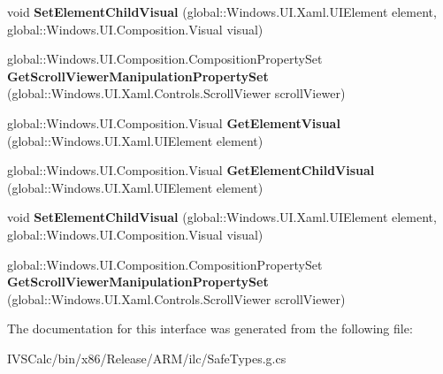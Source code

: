 \begin{DoxyCompactItemize}
void {\bfseries Set\+Element\+Child\+Visual} (global\+::\+Windows.\+U\+I.\+Xaml.\+U\+I\+Element element, global\+::\+Windows.\+U\+I.\+Composition.\+Visual visual)
\item 
\mbox{\label{interface_windows_1_1_u_i_1_1_xaml_1_1_hosting_1_1_i_element_composition_preview_statics_ab27d5dea22cc21e23a4eb65c45a18223}} 
global\+::\+Windows.\+U\+I.\+Composition.\+Composition\+Property\+Set {\bfseries Get\+Scroll\+Viewer\+Manipulation\+Property\+Set} (global\+::\+Windows.\+U\+I.\+Xaml.\+Controls.\+Scroll\+Viewer scroll\+Viewer)
\item 
\mbox{\label{interface_windows_1_1_u_i_1_1_xaml_1_1_hosting_1_1_i_element_composition_preview_statics_ae2b37785a6d7aebf56292ef6ef4b23c8}} 
global\+::\+Windows.\+U\+I.\+Composition.\+Visual {\bfseries Get\+Element\+Visual} (global\+::\+Windows.\+U\+I.\+Xaml.\+U\+I\+Element element)
\item 
\mbox{\label{interface_windows_1_1_u_i_1_1_xaml_1_1_hosting_1_1_i_element_composition_preview_statics_a5c60a91c9c5c8f2c885579f65b715542}} 
global\+::\+Windows.\+U\+I.\+Composition.\+Visual {\bfseries Get\+Element\+Child\+Visual} (global\+::\+Windows.\+U\+I.\+Xaml.\+U\+I\+Element element)
\item 
\mbox{\label{interface_windows_1_1_u_i_1_1_xaml_1_1_hosting_1_1_i_element_composition_preview_statics_ae6c5a85d72b3bb334c01c89b54803023}} 
void {\bfseries Set\+Element\+Child\+Visual} (global\+::\+Windows.\+U\+I.\+Xaml.\+U\+I\+Element element, global\+::\+Windows.\+U\+I.\+Composition.\+Visual visual)
\item 
\mbox{\label{interface_windows_1_1_u_i_1_1_xaml_1_1_hosting_1_1_i_element_composition_preview_statics_ab27d5dea22cc21e23a4eb65c45a18223}} 
global\+::\+Windows.\+U\+I.\+Composition.\+Composition\+Property\+Set {\bfseries Get\+Scroll\+Viewer\+Manipulation\+Property\+Set} (global\+::\+Windows.\+U\+I.\+Xaml.\+Controls.\+Scroll\+Viewer scroll\+Viewer)
\end{DoxyCompactItemize}


The documentation for this interface was generated from the following file\+:\begin{DoxyCompactItemize}
\item 
I\+V\+S\+Calc/bin/x86/\+Release/\+A\+R\+M/ilc/Safe\+Types.\+g.\+cs\end{DoxyCompactItemize}
